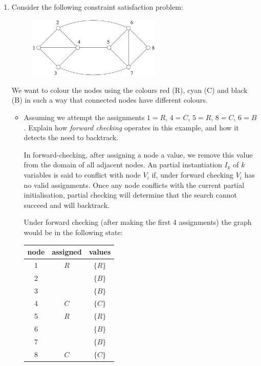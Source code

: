 \documentclass[10pt,\jkfside,a4paper]{article}
\begin{document}
\begin{enumerate}

\item Consider the following constraint satisfaction problem:
\begin{figure}[H]
\centering
\includegraphics[width=0.6\textwidth]{constraintsat}
\end{figure}
We want to colour the nodes using the colours red (R), cyan (C) and black
(B) in such a way that connected nodes have different colours.
\begin{itemize}

\item Assuming we attempt the assignments $1 = R$, $4 = C$, $5 = R$, $8 =
C$, $6 = B$. Explain how \textit{forward checking} operates in this example,
and how it detects the need to backtrack.

In forward-checking, after assigning a node a value, we remove this value
from the domain of all adjacent nodes. An partial instantiation $I_k$ of $k$
variables is said to conflict with node $V_i$ if, under forward checking
$V_i$ has no valid assignments. Once any node conflicts with the current
partial initialisation, partial checking will determine that the search
cannot succeed and will backtrack.

Under forward checking (after making the first 4 assignments) the graph
would be in the following state:

\begin{table}[H]
\centering
\begin{tabular}{c|c|c}
node & assigned & values \\
\hline
1 & $R$ & $\{R\}$ \\
2 & & $\{B\}$ \\
3 & & $\{B\}$ \\
4 & $C$ & $\{C\}$ \\
5 & $R$ & $\{R\}$ \\
6 & & $\{B\}$ \\
7 & & $\{B\}$ \\
8 & $C$ & $\{C\}$
\end{tabular}
\end{table}


\end{itemize}
\end{enumerate}
\end{document}
